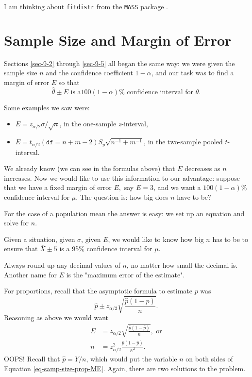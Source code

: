 I am thinking about \texttt{fitdistr} from the \texttt{MASS} package \cite{MASS}.

\section{Sample Size and Margin of Error}
\label{sec-9-7}

Sections \ref{sec-9-2} through \ref{sec-9-5} all began the same way: we were given the sample size
\(n\) and the confidence coefficient \(1-\alpha\), and our task was to
find a margin of error \(E\) so that \[ \hat{\theta}\pm E\mbox{ is a
}100(1-\alpha)\%\mbox{ confidence interval for }\theta.  \]

Some examples we saw were:
\begin{itemize}
\item \(E=z_{\alpha/2}\sigma/\sqrt{n}\), in the one-sample \(z\)-interval,
\item \(E=t_{\alpha/2}(\mathtt{df}=n+m-2)S_{p}\sqrt{n^{-1}+m^{-1}}\), in
the two-sample pooled \(t\)-interval.
\end{itemize}

We already know (we can see in the formulas above) that \(E\)
decreases as \(n\) increases. Now we would like to use this
information to our advantage: suppose that we have a fixed margin of
error \(E,\) say \(E=3\), and we want a \(100(1-\alpha)\%\) confidence
interval for \(\mu\). The question is: how big does \(n\) have to be?

For the case of a population mean the answer is easy: we set up an
equation and solve for \(n\).


Given a situation, given \(\sigma\), given \(E\), we would like to
know how big \(n\) has to be to ensure that \(\overline{X}\pm5\) is a
95\% confidence interval for \(\mu\).


\begin{rem}
Always round up any decimal values of \(n\), no matter how small the
decimal is. Another name for \(E\) is the "maximum error of the
estimate".
\end{rem}

For proportions, recall that the asymptotic formula to estimate \(p\)
was \[ \hat{p}\pm z_{\alpha/2}\sqrt{\frac{\hat{p}(1-\hat{p})}{n}}.  \]
Reasoning as above we would want
\begin{align}
\label{eq-samp-size-prop-ME}
E & =z_{\alpha/2}\sqrt{\frac{\hat{p}(1-\hat{p})}{n}},\mbox{ or}\\
n & =z_{\alpha/2}^{2}\frac{\hat{p}(1-\hat{p})}{E^{2}}.
\end{align}
OOPS! Recall that \(\hat{p}=Y/n\), which would put the variable \(n\)
on both sides of Equation \eqref{eq-samp-size-prop-ME}. Again, there are two
solutions to the problem.

